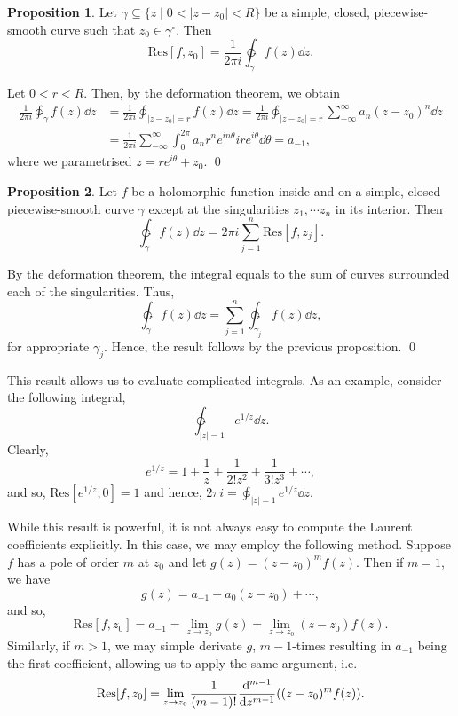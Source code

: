 \documentclass[
]{article}
\theoremstyle{definition}
\newtheorem{prop}{Proposition}
\theoremstyle{definition}
\begin{document}
\begin{prop}
  Let \(\gamma \subseteq \{z \mid 0 < |z - z_0| < R\}\) be a simple, closed, 
  piecewise-smooth curve such that \(z_0 \in \gamma^\circ\). Then 
  \[\text{Res}[f, z_0] = \frac{1}{2\pi i} \ointctrclockwise_\gamma f(z) \dd z.\] 
\end{prop}
\proof

Let \(0 < r < R\). Then, by the deformation theorem, we obtain
\[\begin{split}
    \frac{1}{2\pi i} \ointctrclockwise_\gamma f(z) \dd z 
    & = \frac{1}{2\pi i} \ointctrclockwise_{|z - z_0| = r} f(z) \dd z
      = \frac{1}{2\pi i} \ointctrclockwise_{|z - z_0| = r} 
        \sum_{- \infty}^\infty a_n(z - z_0)^n \dd z \\
    & = \frac{1}{2\pi i} \sum_{- \infty}^\infty 
        \int_0^{2 \pi} a_n r^n e^{i n \theta} i r e^{i \theta} \dd \theta
      = a_{-1},
  \end{split}\] where we parametrised \(z = re^{i \theta} + z_0\). \qed

\begin{prop}
  Let \(f\) be a holomorphic function inside and on a simple, closed piecewise-smooth 
  curve \(\gamma\) except at the singularities \(z_1, \cdots z_n\) in its interior. 
  Then 
  \[\ointctrclockwise_\gamma f(z) \dd z = 2\pi i \sum_{j = 1}^n \text{Res}[f, z_j].\]
\end{prop}
\proof

By the deformation theorem, the integral equals to the sum of curves
surrounded each of the singularities. Thus,
\[\ointctrclockwise_\gamma f(z) \dd z = \sum_{j = 1}^n \ointctrclockwise_{\gamma_j} f(z) \dd z,\]
for appropriate \(\gamma_j\). Hence, the result follows by the previous
proposition. \qed

This result allows us to evaluate complicated integrals. As an example,
consider the following integral,
\[\ointctrclockwise_{|z| = 1} e^{1 / z} \dd z.\] Clearly,
\[e^{1 / z} = 1 + \frac{1}{z} + \frac{1}{2!z^2} + \frac{1}{3!z^3} + \cdots,\]
and so, \(\text{Res}[e^{1 / z}, 0] = 1\) and hence,
\(2\pi i = \ointctrclockwise_{|z| = 1} e^{1 / z} \dd z\).

While this result is powerful, it is not always easy to compute the
Laurent coefficients explicitly. In this case, we may employ the
following method. Suppose \(f\) has a pole of order \(m\) at \(z_0\) and
let \(g(z) = (z - z_0)^m f(z)\). Then if \(m = 1\), we have
\[g(z) = a_{-1} + a_0(z - z_0) + \cdots,\] and so,
\[\text{Res}[f, z_0] = a_{- 1} = \lim_{z \to z_0} g(z) = \lim_{z \to z_0} (z - z_0)f(z).\]
Similarly, if \(m > 1\), we may simple derivate \(g\), \(m - 1\)-times
resulting in \(a_{- 1}\) being the first coefficient, allowing us to
apply the same argument, i.e.
\[\text{Res}[f, z_0] = \lim_{z \to z_0} \frac{1}{(m - 1)!} \dv[m - 1]{z}((z - z_0)^m f(z)).\]
\end{document}
